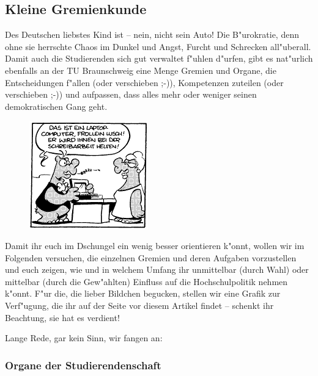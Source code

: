 \subsection{Kleine Gremienkunde}

Des Deutschen liebstes Kind ist -- nein, nicht sein Auto! Die B"urokratie, denn 
ohne sie herrschte Chaos im Dunkel und Angst, Furcht und Schrecken all"uberall. 
Damit auch die Studierenden sich gut verwaltet f"uhlen d"urfen, gibt es 
nat"urlich ebenfalls an der TU Braunschweig eine Menge Gremien und Organe, die 
Entscheidungen f"allen (oder verschieben ;-)), Kompetenzen zuteilen (oder 
verschieben ;-)) und aufpassen, dass alles mehr oder weniger seinen 
demokratischen Gang geht.

\begin{figure}[h]
  \centering\includegraphics[width = 0.7\linewidth]{bilder/comics/otto1_1.png}
\end{figure}

Damit ihr euch im Dschungel ein wenig besser orientieren k"onnt, wollen wir im 
Folgenden versuchen, die einzelnen Gremien und deren Aufgaben vorzustellen und 
euch zeigen, wie und in welchem Umfang ihr unmittelbar (durch Wahl) oder 
mittelbar (durch die Gew"ahlten) Einfluss auf die Hochschulpolitik nehmen 
k"onnt. F"ur die, die lieber Bildchen begucken, stellen wir eine Grafik zur 
Verf"ugung, die ihr auf der Seite vor diesem Artikel findet -- schenkt ihr 
Beachtung, sie hat es verdient!

Lange Rede, gar kein Sinn, wir fangen an:

\subsubsection*{Organe der Studierendenschaft}

